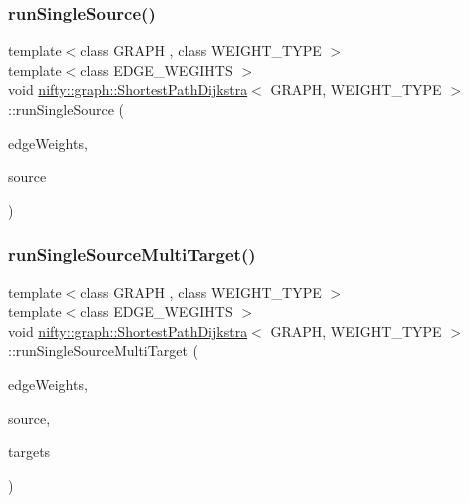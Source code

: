 \mbox{\label{classnifty_1_1graph_1_1ShortestPathDijkstra_ad5f769f5a2acc76b6b0e8914cafd1eb1}} 
\subsubsection{\texorpdfstring{run\+Single\+Source()}{runSingleSource()}}
{\footnotesize\ttfamily template$<$class G\+R\+A\+PH , class W\+E\+I\+G\+H\+T\+\_\+\+T\+Y\+PE $>$ \\
template$<$class E\+D\+G\+E\+\_\+\+W\+E\+G\+I\+H\+TS $>$ \\
void \hyperlink{classnifty_1_1graph_1_1ShortestPathDijkstra}{nifty\+::graph\+::\+Shortest\+Path\+Dijkstra}$<$ G\+R\+A\+PH, W\+E\+I\+G\+H\+T\+\_\+\+T\+Y\+PE $>$\+::run\+Single\+Source (\begin{DoxyParamCaption}\item[{E\+D\+G\+E\+\_\+\+W\+E\+G\+I\+H\+TS}]{edge\+Weights,  }\item[{const int64\+\_\+t}]{source }\end{DoxyParamCaption})\hspace{0.3cm}{\ttfamily [inline]}}

\mbox{\label{classnifty_1_1graph_1_1ShortestPathDijkstra_ac73da5c1ffcd7367ae159264895cc1fc}} 
\subsubsection{\texorpdfstring{run\+Single\+Source\+Multi\+Target()}{runSingleSourceMultiTarget()}}
{\footnotesize\ttfamily template$<$class G\+R\+A\+PH , class W\+E\+I\+G\+H\+T\+\_\+\+T\+Y\+PE $>$ \\
template$<$class E\+D\+G\+E\+\_\+\+W\+E\+G\+I\+H\+TS $>$ \\
void \hyperlink{classnifty_1_1graph_1_1ShortestPathDijkstra}{nifty\+::graph\+::\+Shortest\+Path\+Dijkstra}$<$ G\+R\+A\+PH, W\+E\+I\+G\+H\+T\+\_\+\+T\+Y\+PE $>$\+::run\+Single\+Source\+Multi\+Target (\begin{DoxyParamCaption}\item[{const E\+D\+G\+E\+\_\+\+W\+E\+G\+I\+H\+TS \&}]{edge\+Weights,  }\item[{const int64\+\_\+t}]{source,  }\item[{const std\+::vector$<$ int64\+\_\+t $>$ \&}]{targets }\end{DoxyParamCaption})\hspace{0.3cm}{\ttfamily [inline]}}

